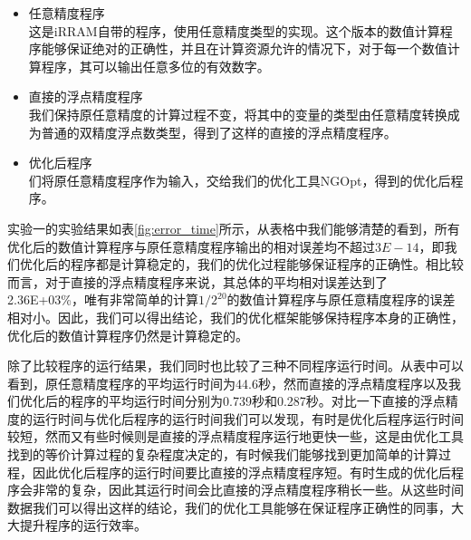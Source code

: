 \begin{itemize}
    \item {\kaishu 任意精度程序} \\
    这是iRRAM自带的程序，使用任意精度类型的实现。这个版本的数值计算程序能够保证绝对的正确性，并且在计算资源允许的情况下，对于每一个数值计算程序，其可以输出任意多位的有效数字。

    \item {\kaishu 直接的浮点精度程序} \\
    我们保持原任意精度的计算过程不变，将其中的变量的类型由任意精度转换成为普通的双精度浮点数类型，得到了这样的直接的浮点精度程序。

    \item {\kaishu 优化后程序} \\
    们将原任意精度程序作为输入，交给我们的优化工具NGOpt，得到的优化后程序。
\end{itemize}

实验一的实验结果如表\ref{fig:error_time}所示，从表格中我们能够清楚的看到，所有优化后的数值计算程序与原任意精度程序输出的相对误差均不超过$3E-14$，即我们优化后的程序都是计算稳定的，我们的优化过程能够保证程序的正确性。相比较而言，对于直接的浮点精度程序来说，其总体的平均相对误差达到了2.36E+03\%，唯有非常简单的计算$1/2^{20}$的数值计算程序与原任意精度程序的误差相对小。因此，我们可以得出结论，我们的优化框架能够保持程序本身的正确性，优化后的数值计算程序仍然是计算稳定的。

除了比较程序的运行结果，我们同时也比较了三种不同程序运行时间。从表中可以看到，原任意精度程序的平均运行时间为44.6秒，然而直接的浮点精度程序以及我们优化后的程序的平均运行时间分别为0.739秒和0.287秒。对比一下直接的浮点精度的运行时间与优化后程序的运行时间我们可以发现，有时是优化后程序运行时间较短，然而又有些时候则是直接的浮点精度程序运行地更快一些，这是由优化工具找到的等价计算过程的复杂程度决定的，有时候我们能够找到更加简单的计算过程，因此优化后程序的运行时间要比直接的浮点精度程序短。有时生成的优化后程序会非常的复杂，因此其运行时间会比直接的浮点精度程序稍长一些。从这些时间数据我们可以得出这样的结论，我们的优化工具能够在保证程序正确性的同事，大大提升程序的运行效率。

